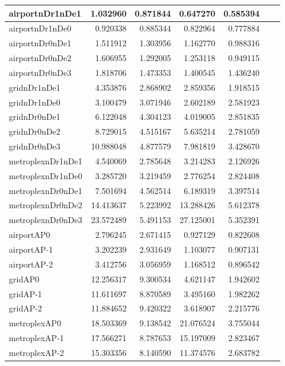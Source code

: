 \begin{longtable}{|l|r|r|r|r|r|r|}
\endlastfoot
airportnDr1nDe1 & 1.032960 & 0.871844 & 0.647270 & 0.585394 \\ \hline
airportnDr1nDe0 & 0.920338 & 0.885344 & 0.822964 & 0.777884 \\ \hline
airportnDr0nDe1 & 1.511912 & 1.303956 & 1.162770 & 0.988316 \\ \hline
airportnDr0nDe2 & 1.606955 & 1.292005 & 1.253118 & 0.949115 \\ \hline
airportnDr0nDe3 & 1.818706 & 1.473353 & 1.400545 & 1.436240 \\ \hline
gridnDr1nDe1 & 4.353876 & 2.868902 & 2.859356 & 1.918515 \\ \hline
gridnDr1nDe0 & 3.100479 & 3.071946 & 2.602189 & 2.581923 \\ \hline
gridnDr0nDe1 & 6.122048 & 4.304123 & 4.019005 & 2.851835 \\ \hline
gridnDr0nDe2 & 8.729015 & 4.515167 & 5.635214 & 2.781059 \\ \hline
gridnDr0nDe3 & 10.988048 & 4.877579 & 7.981819 & 3.428670 \\ \hline
metroplexnDr1nDe1 & 4.540069 & 2.785648 & 3.214283 & 2.126926 \\ \hline
metroplexnDr1nDe0 & 3.285720 & 3.219459 & 2.776254 & 2.824408 \\ \hline
metroplexnDr0nDe1 & 7.501694 & 4.562514 & 6.189319 & 3.397514 \\ \hline
metroplexnDr0nDe2 & 14.413637 & 5.223992 & 13.288426 & 5.612378 \\ \hline
metroplexnDr0nDe3 & 23.572489 & 5.491153 & 27.125001 & 5.352391 \\ \hline
airportAP0 & 2.796245 & 2.671415 & 0.927129 & 0.822608 \\ \hline
airportAP-1 & 3.202239 & 2.931649 & 1.103077 & 0.907131 \\ \hline
airportAP-2 & 3.412756 & 3.056959 & 1.168512 & 0.896542 \\ \hline
gridAP0 & 12.256317 & 9.300534 & 4.621147 & 1.942602 \\ \hline
gridAP-1 & 11.611697 & 8.870589 & 3.495160 & 1.982262 \\ \hline
gridAP-2 & 11.884652 & 9.420322 & 3.618907 & 2.215776 \\ \hline
metroplexAP0 & 18.503369 & 9.138542 & 21.076524 & 3.755044 \\ \hline
metroplexAP-1 & 17.566271 & 8.787653 & 15.197009 & 2.823467 \\ \hline
metroplexAP-2 & 15.303356 & 8.140590 & 11.374576 & 2.683782 \\ \hline

\end{longtable}
